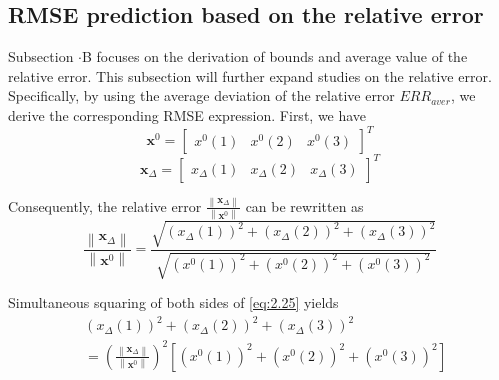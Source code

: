 \documentclass[journal]{IEEEtran}
\begin{document}
\subsection{RMSE prediction based on the relative error}

Subsection \uppercase\expandafter{}${\cdot}$B focuses on the derivation of bounds and average value of the relative error. This subsection will further  expand studies on the relative error. Specifically, by using the average deviation of the relative error $ERR_{aver}$, we derive the corresponding RMSE expression. First, we have
\begin{equation}\label{eq:2.23}
   \mathbf{x}^0=\begin{bmatrix}x^0\left(1\right)&x^0\left(2\right)&x^0\left(3\right)\end{bmatrix}^T
\end{equation}
\begin{equation}\label{eq:2.24}
   \mathbf{x}_{\Delta}=\begin{bmatrix}x_{\Delta}\left(1\right)&x_{\Delta}\left(2\right)&x_{\Delta}\left(3\right)\end{bmatrix}^T
\end{equation}

 Consequently, the relative error $\frac{\left\|{\mathbf{x}_{\Delta}}\right\|}{\left\|{\mathbf{x}^{0}}\right\|}$ can be rewritten as
\begin{equation}\label{eq:2.25}
   \frac{\left\|\mathbf{x}_\Delta\right\|}{\left\|\mathbf{x}^0\right\|}=\frac{\sqrt{\left(x_{\Delta}\left(1\right)\right)^2+\left(x_{\Delta}\left(2\right)\right)^2+\left(x_{\Delta}\left(3\right)\right)^2}}{\sqrt{\left(x^0\left(1\right)\right)^2+\left(x^0\left(2\right)\right)^2+\left(x^0\left(3\right)\right)^2}}
\end{equation}

Simultaneous squaring of both sides of \eqref{eq:2.25} yields
\begin{equation}\label{eq:2.26}
   \begin{aligned}
      & \left(x_{\Delta}\left(1\right)\right)^2+\left(x_{\Delta}\left(2\right)\right)^2+\left(x_{\Delta}\left(3\right)\right)^2 \\
      &= \left(\frac{\left\|\mathbf{x}_{\Delta}\right\|}{\left\|\mathbf{x}^0\right\|}\right)^2\left[\left(x^0\left(1\right)\right)^2+\left(x^0\left(2\right)\right)^2+\left(x^0\left(3\right)\right)^2\right]    
   \end{aligned}
\end{equation}
\end{document}
